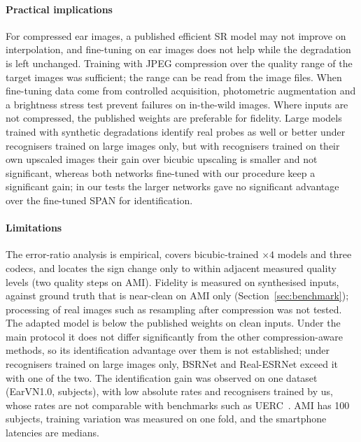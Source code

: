 \paragraph{Practical implications} For compressed ear images, a published efficient SR model may not improve on interpolation, and fine-tuning on ear images does not help while the degradation is left unchanged. Training with JPEG compression over the quality range of the target images was sufficient; the range can be read from the image files. When fine-tuning data come from controlled acquisition, photometric augmentation and a brightness stress test prevent failures on in-the-wild images. Where inputs are not compressed, the published weights are preferable for fidelity. Large models trained with synthetic degradations identify real probes as well or better under recognisers trained on large images only, but with recognisers trained on their own upscaled images their gain over bicubic upscaling is smaller and not significant, whereas both networks fine-tuned with our procedure keep a significant gain; in our tests the larger networks gave no significant advantage over the fine-tuned SPAN for identification.

\paragraph{Limitations} The error-ratio analysis is empirical, covers bicubic-trained $\times4$ models and three codecs, and locates the sign change only to within adjacent measured quality levels (two quality steps on AMI). Fidelity is measured on synthesised inputs, against ground truth that is near-clean on AMI only (Section~\ref{sec:benchmark}); processing of real images such as resampling after compression was not tested. The adapted model is below the published weights on clean inputs. Under the main protocol it does not differ significantly from the other compression-aware methods, so its identification advantage over them is not established; under recognisers trained on large images only, BSRNet and Real-ESRNet exceed it with one of the two. The identification gain was observed on one dataset (EarVN1.0, \RecSubj{} subjects), with low absolute rates and recognisers trained by us, whose rates are not comparable with benchmarks such as UERC~\cite{emersic2019uerc}. AMI has 100 subjects, training variation was measured on one fold, and the smartphone latencies are medians.

